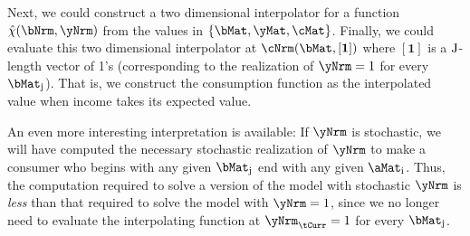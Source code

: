 \documentclass[./SolvingMicroDSOPs]{subfiles}
\begin{document}
{  Next, we could construct a two dimensional interpolator for a function $\hat{\chi}(\bNrm,\yNrm)$ from the values in $\{\bMat,\yMat,\cMat\}$.  Finally, we could evaluate this two dimensional interpolator at $\mathfrak{\cNrm}(\bMat,[\mathbf{1}])$ where $[\mathbf{1}]$ is a $\mathrm{J}$-length vector of 1's (corresponding to the realization of $\yNrm=1$ for every $\bMat_{\bIdx}$).  That is, we construct the consumption function as the interpolated value when income takes its expected value.
  
  An even more interesting interpretation is available:  If $\yNrm$ is stochastic, we will have computed the necessary stochastic realization of $\yNrm$ to make a consumer who begins with any given $\bMat_{\bIdx}$ end with any given $\aMat_{\aIdx}$.  Thus, the computation required to solve a version of the model with stochastic $\yNrm$ is \textit{less} than that required to solve the model with $\yNrm=1$, since we no longer need to evaluate the interpolating function at $\yNrm_{\tCurr}=1$ for every $\bMat_{\bIdx}$.
} %
\end{document}
